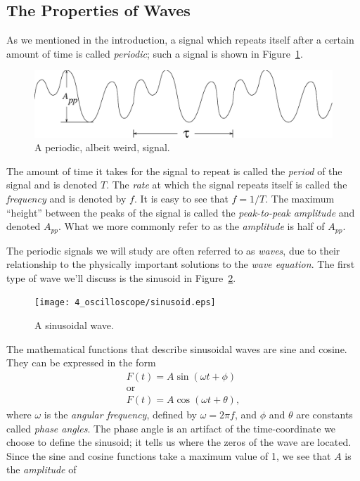 \subsection{The Properties of Waves}
\label{sec:SCOPE:waveprop}
As we mentioned in the introduction, a signal which repeats itself after a 
certain amount of time is called {\it periodic}; such a signal is shown in 
Figure~\ref{fig:scope:periodic}.
\begin{figure}[htb]
\centering \epsfxsize=12cm \includegraphics[scale=0.5]{4_oscilloscope/periodic.eps}
\caption{A periodic, albeit weird, signal.}
\label{fig:scope:periodic}
\end{figure}
The amount of time it takes for the signal to repeat is called the {\it period}
of the signal and is denoted $T$.  The {\it rate} at which 
the signal repeats itself is called the {\it frequency} and is denoted by $f$. 
It is easy to see that $f=1/T$.  The maximum ``height'' between the peaks of
the signal is called the {\it peak-to-peak amplitude} and denoted $A_{pp}$.
What we more commonly refer to as the {\it amplitude} is half of $A_{pp}$.  

The periodic signals we will study are often referred to as {\it waves}, due to
their relationship to the physically important solutions to the {\it wave
equation}.  The first type of wave we'll discuss is the sinusoid in 
Figure~\ref{fig:scope:sinusoid}.
\begin{figure}[!htb]
\centering \epsfxsize=8cm \texttt{[image: 4\_oscilloscope/sinusoid.eps]}
\caption{A sinusoidal wave.}
\label{fig:scope:sinusoid}
\end{figure}
The mathematical functions that describe sinusoidal waves are sine and cosine.
They can be expressed in the form
\begin{eqnarray*}
& F(t) = A \sin(\omega t+\phi) & \\ 
& \mbox{or} & \\
& F(t) = A \cos(\omega t+\theta), &  
\end{eqnarray*}
where $\omega$ is the {\it angular frequency}, defined by $\omega=2\pi f$, and
$\phi$ and $\theta$ are constants called {\it phase angles}.  The phase angle
is an artifact of the time-coordinate we choose to define the sinusoid; it
tells us where the zeros of the wave are located.  Since the sine and cosine
functions take a maximum value of 1, we see that $A$ is the {\it amplitude} of 

